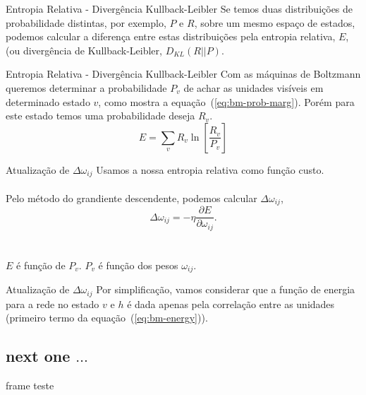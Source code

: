 \begin{frame}{Entropia Relativa - Divergência Kullback-Leibler}%
  \justifying%
  Se temos duas distribuições de probabilidade distintas, por exemplo, $P$ e $R$, sobre um mesmo espaço de estados, podemos calcular a diferença entre estas distribuições pela entropia relativa, $E$, (ou divergência de Kullback-Leibler, $D_{KL}(R||P)$.
\end{frame}
  
\begin{frame}{Entropia Relativa - Divergência Kullback-Leibler}%
  \justifying%
  Com as máquinas de Boltzmann queremos determinar a probabilidade $P_{v}$ de achar as unidades visíveis em determinado estado $v$, como mostra a equação~(\ref{eq:bm-prob-marg}). Porém para este estado temos uma probabilidade deseja $R_{v}$.
  \begin{equation}%
    \label{eq:bm-entropy}
    E = \sum_{v} R_{v} \ln \left[\frac{R_{v}}{P_{v}} \right]
  \end{equation}
\end{frame}

\begin{frame}{Atualização de $\Delta \omega_{ij}$}%
  \justifying%
  Usamos a nossa entropia relativa como função custo.
  \\~\\
  Pelo método do grandiente descendente, podemos calcular $\Delta \omega_{ij}$,
  \begin{equation}%
    \label{eq:omega-delta}
    \Delta \omega_{ij} = -\eta \frac{\partial E}{\partial \omega_{ij}}.
  \end{equation}
  \\~\\
  $E$ é função de $P_{v}$.
  $P_{v}$ é função dos pesos $\omega_{ij}$.
\end{frame} 

\begin{frame}{Atualização de $\Delta \omega_{ij}$}%
  \justifying%
  Por simplificação, vamos considerar que a função de energia para a rede no estado $v$ e $h$ é dada apenas pela correlação entre as unidades (primeiro termo da equação~(\ref{eq:bm-energy})).
\end{frame}

\subsection{next one $\dots$}

\begin{frame}{frame teste}
%  
\end{frame}
